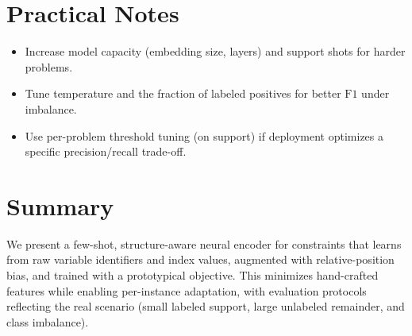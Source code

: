 \documentclass[11pt]{article}
\begin{document}
\section{Practical Notes}
\begin{itemize}[noitemsep]
  \item Increase model capacity (embedding size, layers) and support shots for harder problems.
  \item Tune temperature and the fraction of labeled positives for better $\mathrm{F1}$ under imbalance.
  \item Use per-problem threshold tuning (on support) if deployment optimizes a specific precision/recall trade-off.
\end{itemize}

\section{Summary}
We present a few-shot, structure-aware neural encoder for constraints that learns from raw variable identifiers and index values, augmented with relative-position bias, and trained with a prototypical objective. This minimizes hand-crafted features while enabling per-instance adaptation, with evaluation protocols reflecting the real scenario (small labeled support, large unlabeled remainder, and class imbalance).
\end{document}
